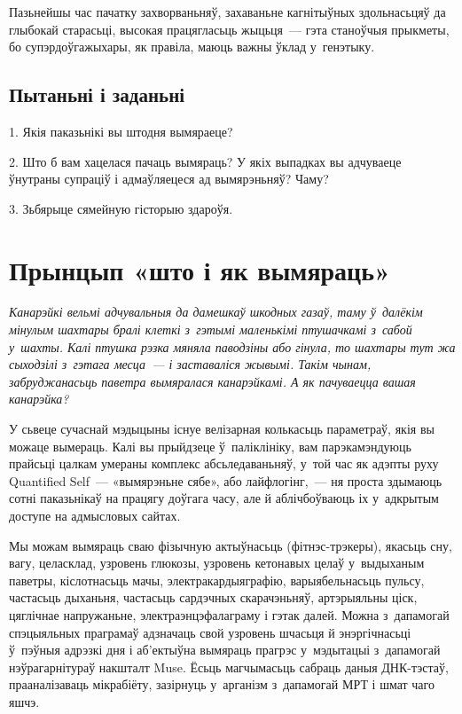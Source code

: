 Пазьнейшы час пачатку захворваньняў, захаваньне кагнітыўных здольнасьцяў да глыбокай старасьці, высокая працягласьць жыцьця~--- гэта станоўчыя прыкметы, бо супэрдоўгажыхары, як правіла, маюць важны ўклад у~генэтыку.

\subsection*{Пытаньні і заданьні}

1. Якія паказьнікі вы штодня вымяраеце?

2. Што б вам хацелася пачаць вымяраць? У якіх выпадках вы адчуваеце ўнутраны супраціў і адмаўляецеся ад вымярэньняў? Чаму?

3. Зьбярыце сямейную гісторыю здароўя.


\section{Прынцып «што і як вымяраць»}

\emph{Канарэйкі вельмі адчувальныя да дамешкаў шкодных газаў, таму ў~далёкім мінулым шахтары бралі клеткі з~гэтымі маленькімі птушачкамі з~сабой у~шахты. Калі птушка рэзка мяняла паводзіны або гінула, то шахтары тут жа сыходзілі з~гэтага месца~--- і заставаліся жывымі. Такім чынам, забруджанасьць паветра вымяралася канарэйкамі. А як пачуваецца вашая канарэйка?}

У сьвеце сучаснай мэдыцыны існуе велізарная колькасьць параметраў, якія вы можаце вымераць. Калі вы прыйдзеце ў~паліклініку, вам парэкамэндуюць прайсьці цалкам умераны комплекс абсьледаваньняў, у~той час як адэпты руху Quantified Self~--- «вымярэньне сябе», або лайфлогінг,~--- ня проста здымаюць сотні паказьнікаў на працягу доўгага часу, але й аблічбоўваюць іх у~адкрытым доступе на адмысловых сайтах.

Мы можам вымяраць сваю фізычную актыўнасьць (фітнэс-трэкеры), якасьць сну, вагу, целасклад, узровень глюкозы, узровень кетонавых целаў у~выдыханым паветры, кіслотнасьць мачы, электракардыяграфію, варыябельнасьць пульсу, частасьць дыханьня, частасьць сардэчных скарачэньняў, артэрыяльны ціск, цяглічнае напружаньне, электраэнцэфалаграму і гэтак далей. Можна з~дапамогай спэцыяльных праграмаў адзначаць свой узровень шчасьця й энэргічнасьці ў~пэўныя адрэзкі дня і аб'ектыўна вымяраць прагрэс у~мэдытацыі з~дапамогай нэўрагарнітураў накшталт Muse. Ёсьць магчымасьць сабраць даныя ДНК-тэстаў, прааналізаваць мікрабіёту, зазірнуць у~арганізм з~дапамогай МРТ і шмат чаго яшчэ.

